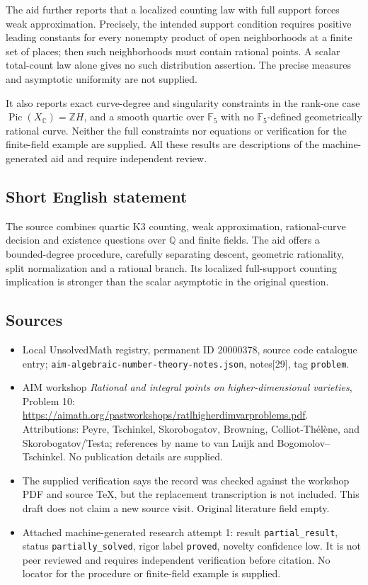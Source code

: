 \documentclass[11pt]{article}
\newcommand{\Z}{\mathbb{Z}}
\newcommand{\Q}{\mathbb{Q}}
\newcommand{\C}{\mathbb{C}}
\newcommand{\F}{\mathbb{F}}
\begin{document}
The aid further reports that a localized counting law with full support forces weak approximation. Precisely, the intended support condition requires positive leading constants for every nonempty product of open neighborhoods at a finite set of places; then such neighborhoods must contain rational points. A scalar total-count law alone gives no such distribution assertion. The precise measures and asymptotic uniformity are not supplied.

It also reports exact curve-degree and singularity constraints in the rank-one case $\operatorname{Pic}(X_{\C})=\Z H$, and a smooth quartic over $\F_5$ with no $\F_5$-defined geometrically rational curve. Neither the full constraints nor equations or verification for the finite-field example are supplied. All these results are descriptions of the machine-generated aid and require independent review.
\subsection{Short English statement}
The source combines quartic K3 counting, weak approximation, rational-curve decision and existence questions over $\Q$ and finite fields. The aid offers a bounded-degree procedure, carefully separating descent, geometric rationality, split normalization and a rational branch. Its localized full-support counting implication is stronger than the scalar asymptotic in the original question.
\subsection{Sources}
\begin{itemize}
\item Local UnsolvedMath registry, permanent ID 20000378, source code catalogue entry; \texttt{aim-algebraic-number-theory-notes.json}, notes[29], tag \texttt{problem}.
\item AIM workshop \emph{Rational and integral points on higher-dimensional varieties}, Problem 10: \url{https://aimath.org/pastworkshops/ratlhigherdimvarproblems.pdf}. Attributions: Peyre, Tschinkel, Skorobogatov, Browning, Colliot-Thélène, and Skorobogatov/Testa; references by name to van Luijk and Bogomolov--Tschinkel. No publication details are supplied.
\item The supplied verification says the record was checked against the workshop PDF and source TeX, but the replacement transcription is not included. This draft does not claim a new source visit. Original literature field empty.
\item Attached machine-generated research attempt 1: result \texttt{partial\_result}, status \texttt{partially\_solved}, rigor label \texttt{proved}, novelty confidence low. It is not peer reviewed and requires independent verification before citation. No locator for the procedure or finite-field example is supplied.
\end{itemize}
\end{document}

